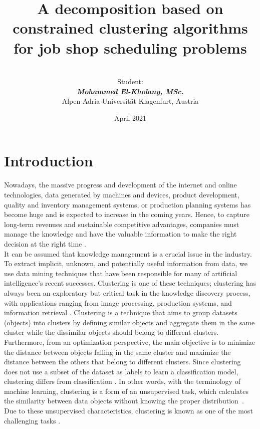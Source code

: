 \documentclass{article}
\title{\textbf{A decomposition based on constrained clustering algorithms for job shop scheduling problems} \\}
\author{\\[1in] Student: \\ \textit{\textbf{Mohammed El-Kholany, MSc.}}\\Alpen-Adria-Universität Klagenfurt, Austria \\[3in] }
\date{April 2021}
\begin{document}
\clearpage\maketitle
\thispagestyle{empty}
\clearpage
\setcounter{page}{1}
\newpage
\section{Introduction}
Nowadays, the massive progress and development of the internet and online technologies, data generated by machines and devices, product development, quality and inventory management systems, or production planning systems has become huge and is expected to increase in the coming years. Hence, to capture long-term revenues and sustainable competitive advantages, companies must manage the knowledge and have the valuable information to make the right decision at the right time \cite{benabdellah2019survey}. \\

It can be assumed that knowledge management is a crucial issue in the industry. To extract implicit, unknown, and potentially useful information from data, we use data mining techniques that have been responsible for many of artificial intelligence’s recent successes. Clustering is one of these techniques; clustering has always been an exploratory but critical task in the knowledge discovery process, with applications ranging from image processing, production systems, and information retrieval \cite{benabdellah2019survey}. Clustering is a technique that aims to group datasets (objects) into clusters by defining similar objects and aggregate them in the same cluster while the dissimilar objects should belong to different clusters. \\

Furthermore, from an optimization perspective, the main objective is to minimize the distance between objects falling in the same cluster and maximize the distance between the others that belong to different clusters. Since clustering does not use a subset of the dataset as labels to learn a classification model, clustering differs from classification \cite{wagstaff2001constrained}. In other words, with the terminology of machine learning, clustering is a form of an unsupervised task, which calculates the similarity between data objects without knowing the proper distribution~\cite{li2018geometric}. Due to these unsupervised characteristics, clustering is known as one of the most challenging tasks \cite{benabdellah2019survey}. \\
\end{document}
